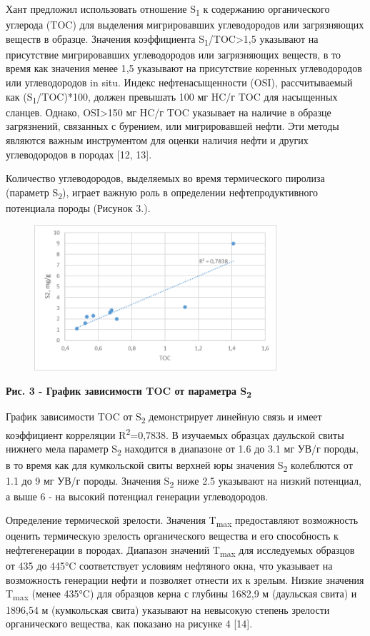 Хант предложил использовать отношение S\textsubscript{1} к содержанию
органического углерода (TOC) для выделения мигрировавших углеводородов
или загрязняющих веществ в образце. Значения коэффициента
S\textsubscript{1}/TOC\textgreater1,5 указывают на присутствие
мигрировавших углеводородов или загрязняющих веществ, в то время как
значения менее 1,5 указывают на присутствие коренных углеводородов или
углеводородов in situ. Индекс нефтенасыщенности (OSI), рассчитываемый
как (S\textsubscript{1}/TOC)*100, должен превышать 100 мг HC/г TOC для
насыщенных сланцев. Однако, OSI\textgreater150 мг HC/г TOC указывает на
наличие в образце загрязнений, связанных с бурением, или мигрировавшей
нефти. Эти методы являются важным инструментом для оценки наличия нефти
и других углеводородов в породах {[}12, 13{]}.

Количество углеводородов, выделяемых во время термического пиролиза
(параметр S\textsubscript{2}), играет важную роль в определении
нефтепродуктивного потенциала породы (Рисунок 3.).

\begin{figure}[H]
	\centering
	\includegraphics[width=0.8\textwidth]{assets/1260}
	\caption*{}
\end{figure}

{\bfseries Рис. 3 - График зависимости TOC от параметра S\textsubscript{2}}

График зависимости TOC от S\textsubscript{2} демонстрирует линейную
связь и имеет коэффициент корреляции R\textsuperscript{2}=0,7838. В
изучаемых образцах даульской свиты нижнего мела параметр
S\textsubscript{2} находится в диапазоне от 1.6 до 3.1 мг УВ/г породы, в
то время как для кумкольской свиты верхней юры значения
S\textsubscript{2} колеблются от 1.1 до 9 мг УВ/г породы. Значения
S\textsubscript{2} ниже 2.5 указывают на низкий потенциал, а выше 6 - на
высокий потенциал генерации углеводородов.

Определение термической зрелости. Значения T\textsubscript{max}
предоставляют возможность оценить термическую зрелость органического
вещества и его способность к нефтегенерации в породах. Диапазон значений
T\textsubscript{max} для исследуемых образцов от 435 до 445°C
соответствует условиям нефтяного окна, что указывает на возможность
генерации нефти и позволяет отнести их к зрелым. Низкие значения
T\textsubscript{max} (менее 435°C) для образцов керна с глубины 1682,9 м
(даульская свита) и 1896,54 м (кумкольская свита) указывают на невысокую
степень зрелости органического вещества, как показано на рисунке 4
{[}14{]}.


